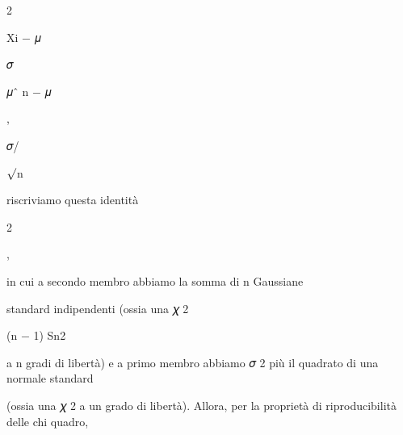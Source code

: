 \documentclass[a4paper,portrait,12pt]{article}
\begin{document}
2





\begin{flushleft}
Xi $-$ 𝜇
\end{flushleft}


\begin{flushleft}
𝜎
\end{flushleft}





\begin{flushleft}
𝜇ˆ n $-$ 𝜇
\end{flushleft}


,


\begin{flushleft}
𝜎/
\end{flushleft}


\begin{flushleft}
$\surd$n
\end{flushleft}





\begin{flushleft}
riscriviamo questa identit\`{a}
\end{flushleft}





2





,





\begin{flushleft}
in cui a secondo membro abbiamo la somma di n Gaussiane
\end{flushleft}


\begin{flushleft}
standard indipendenti (ossia una 𝜒 2
\end{flushleft}


\begin{flushleft}
(n $-$ 1) Sn2
\end{flushleft}


\begin{flushleft}
a n gradi di libert\`{a}) e a primo membro abbiamo 𝜎 2 più il quadrato di una normale standard
\end{flushleft}


\begin{flushleft}
(ossia una 𝜒 2 a un grado di libert\`{a}). Allora, per la propriet\`{a} di riproducibilit\`{a} delle chi quadro,
\end{flushleft}
\end{document}
